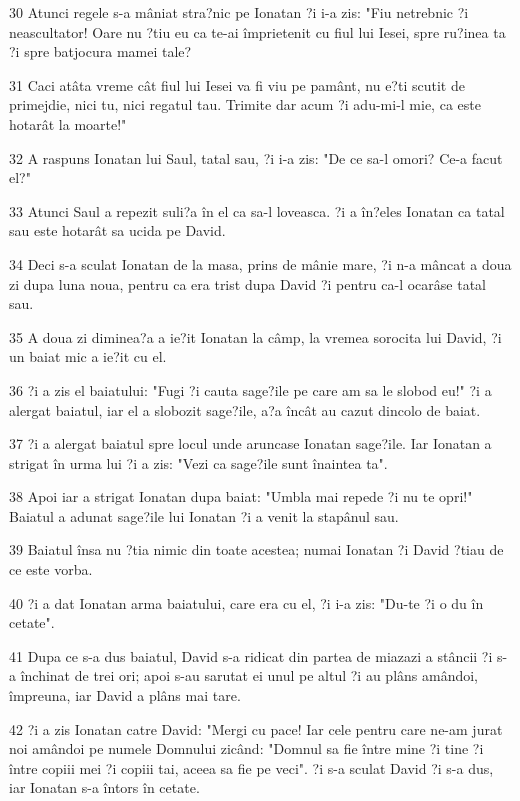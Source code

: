 \par 30 Atunci regele s-a mâniat stra?nic pe Ionatan ?i i-a zis: "Fiu netrebnic ?i neascultator! Oare nu ?tiu eu ca te-ai împrietenit cu fiul lui Iesei, spre ru?inea ta ?i spre batjocura mamei tale?
\par 31 Caci atâta vreme cât fiul lui Iesei va fi viu pe pamânt, nu e?ti scutit de primejdie, nici tu, nici regatul tau. Trimite dar acum ?i adu-mi-l mie, ca este hotarât la moarte!"
\par 32 A raspuns Ionatan lui Saul, tatal sau, ?i i-a zis: "De ce sa-l omori? Ce-a facut el?"
\par 33 Atunci Saul a repezit suli?a în el ca sa-l loveasca. ?i a în?eles Ionatan ca tatal sau este hotarât sa ucida pe David.
\par 34 Deci s-a sculat Ionatan de la masa, prins de mânie mare, ?i n-a mâncat a doua zi dupa luna noua, pentru ca era trist dupa David ?i pentru ca-l ocarâse tatal sau.
\par 35 A doua zi diminea?a a ie?it Ionatan la câmp, la vremea sorocita lui David, ?i un baiat mic a ie?it cu el.
\par 36 ?i a zis el baiatului: "Fugi ?i cauta sage?ile pe care am sa le slobod eu!" ?i a alergat baiatul, iar el a slobozit sage?ile, a?a încât au cazut dincolo de baiat.
\par 37 ?i a alergat baiatul spre locul unde aruncase Ionatan sage?ile. Iar Ionatan a strigat în urma lui ?i a zis: "Vezi ca sage?ile sunt înaintea ta".
\par 38 Apoi iar a strigat Ionatan dupa baiat: "Umbla mai repede ?i nu te opri!" Baiatul a adunat sage?ile lui Ionatan ?i a venit la stapânul sau.
\par 39 Baiatul însa nu ?tia nimic din toate acestea; numai Ionatan ?i David ?tiau de ce este vorba.
\par 40 ?i a dat Ionatan arma baiatului, care era cu el, ?i i-a zis: "Du-te ?i o du în cetate".
\par 41 Dupa ce s-a dus baiatul, David s-a ridicat din partea de miazazi a stâncii ?i s-a închinat de trei ori; apoi s-au sarutat ei unul pe altul ?i au plâns amândoi, împreuna, iar David a plâns mai tare.
\par 42 ?i a zis Ionatan catre David: "Mergi cu pace! Iar cele pentru care ne-am jurat noi amândoi pe numele Domnului zicând: "Domnul sa fie între mine ?i tine ?i între copiii mei ?i copiii tai, aceea sa fie pe veci". ?i s-a sculat David ?i s-a dus, iar Ionatan s-a întors în cetate.

